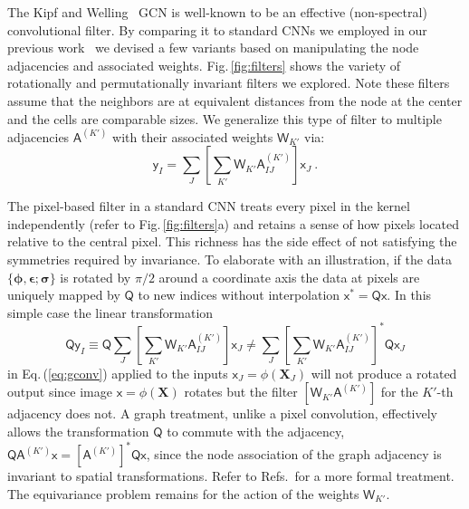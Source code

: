 \documentclass[12pt,reqno]{article}
\newcommand{\ADD}[1]{{#1}}
\newcommand{\fref}[1]{Fig.\,\ref{#1}}
\newcommand{\eref}[1]{Eq.\,(\ref{#1})}
\newcommand{\crefs}[1]{Refs.\,\cite{#1}}
\newcommand{\Xb}{\mathbf{X}}
\newcommand{\As}{\mathsf{A}}
\newcommand{\xs}{\mathsf{x}}
\newcommand{\ys}{\mathsf{y}}
\newcommand{\Ws}{\mathsf{W}}
\newcommand{\Qs}{\mathsf{Q}}
\newcommand{\epsilonb}{{\boldsymbol{\epsilon}}}
\newcommand{\sigmab}{{\boldsymbol{\sigma}}}
\newcommand{\phib}{{\boldsymbol{\phi}}}
\begin{document}
The Kipf and Welling~\cite{kipf2016semi} GCN is well-known to be an effective (non-spectral) convolutional filter.
By comparing it to standard CNNs we employed in our previous work~\cite{frankel2019predicting} we devised a few variants based on manipulating the node adjacencies and associated weights.
\fref{fig:filters} shows the variety of rotationally and permutationally invariant filters we explored.
Note these filters assume that the neighbors are at equivalent distances from the node at the center and the cells are comparable sizes.
\ADD{
We generalize this type of filter to multiple adjacencies $ \As^{(K')}$ with their associated weights $\Ws_{K'}$ via:
\begin{equation} \label{eq:gcnn}
\ys_I = \sum_J \left[ \sum_{K'} \Ws_{K'}  \As_{IJ}^{(K')} \right] \xs_J  \ .
\end{equation}
}

The pixel-based filter in a standard CNN treats every pixel in the kernel independently (refer to \fref{fig:filters}a) and retains a sense of how pixels located relative to the central pixel.
This richness has the side effect of not satisfying the symmetries required by invariance.
\ADD{
To elaborate with an illustration, if the data $\{ \phib, \epsilonb; \sigmab \}$ is rotated by $\pi/2$ around a coordinate axis the data at pixels are uniquely mapped by $\Qs$ to new indices without interpolation $\xs^* = \Qs \xs$.
In this simple case the linear transformation
\begin{equation}
\Qs \ys_I \equiv
\Qs \sum_J \left[ \sum_{K'} \Ws_{K'}  \As_{IJ}^{(K')} \right] \xs_J
\neq
\sum_J \left[ \sum_{K'} \Ws_{K'}  \As_{IJ}^{(K')} \right]^* \Qs \xs_J
\end{equation}
in \eref{eq:gconv} applied to the inputs $\xs_J =  \phi(\Xb_J)$ will not produce a rotated output since image $\xs = \phi(\Xb)$ rotates  but the filter $\left[ \Ws_{K'} \As^{(K')}\right]$ for the $K'$-th adjacency does not.
A graph treatment, unlike a pixel convolution, effectively allows the transformation $\Qs$ to commute with the adjacency, $ \Qs \As^{(K')} \xs = \left[\As^{(K')} \right]^* \Qs \xs$, since the node association of the graph adjacency is invariant to spatial transformations.
Refer to \crefs{kondor2018generalization,finzi2020generalizing} for a more formal treatment.
The equivariance problem remains for the action of the weights $\Ws_{K'}$.
}
\end{document}
